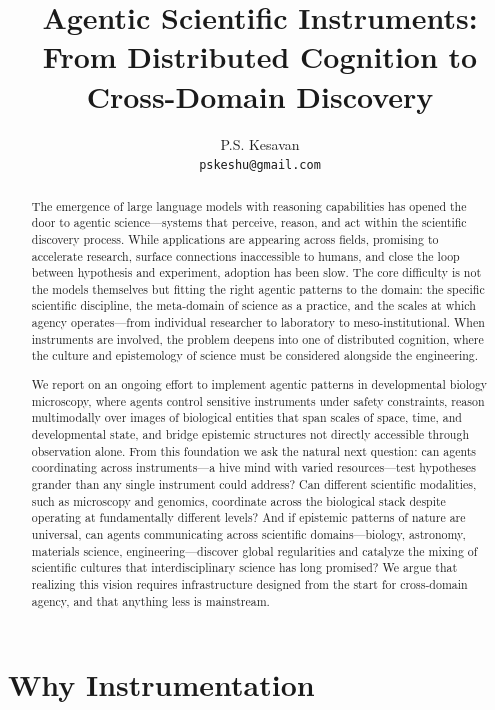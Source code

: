 \documentclass[11pt]{article}
\title{Agentic Scientific Instruments:\\From Distributed Cognition to Cross-Domain Discovery}
\author{P.S. Kesavan\\\texttt{pskeshu@gmail.com}}
\date{}
\begin{document}
\maketitle

\begin{abstract}
The emergence of large language models with reasoning capabilities has opened the door to agentic science---systems that perceive, reason, and act within the scientific discovery process.
While applications are appearing across fields, promising to accelerate research, surface connections inaccessible to humans, and close the loop between hypothesis and experiment, adoption has been slow.
The core difficulty is not the models themselves but fitting the right agentic patterns to the domain: the specific scientific discipline, the meta-domain of science as a practice, and the scales at which agency operates---from individual researcher to laboratory to meso-institutional.
When instruments are involved, the problem deepens into one of distributed cognition, where the culture and epistemology of science must be considered alongside the engineering.

We report on an ongoing effort to implement agentic patterns in developmental biology microscopy, where agents control sensitive instruments under safety constraints, reason multimodally over images of biological entities that span scales of space, time, and developmental state, and bridge epistemic structures not directly accessible through observation alone.
From this foundation we ask the natural next question: can agents coordinating across instruments---a hive mind with varied resources---test hypotheses grander than any single instrument could address?
Can different scientific modalities, such as microscopy and genomics, coordinate across the biological stack despite operating at fundamentally different levels?
And if epistemic patterns of nature are universal, can agents communicating across scientific domains---biology, astronomy, materials science, engineering---discover global regularities and catalyze the mixing of scientific cultures that interdisciplinary science has long promised?
We argue that realizing this vision requires infrastructure designed from the start for cross-domain agency, and that anything less is mainstream.
\end{abstract}

\section{Why Instrumentation}
\end{document}
